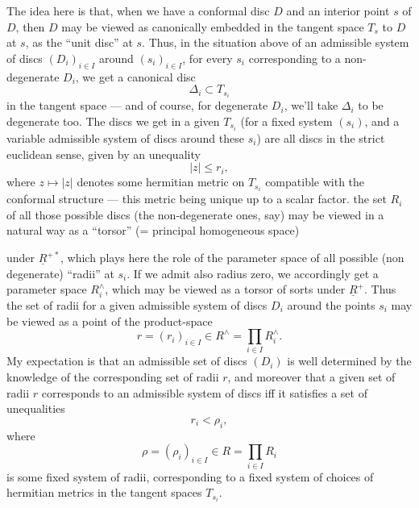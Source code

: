\documentclass[11pt,a4paper]{article}
\begin{document}
The idea here is that, when we have a conformal disc $D$ and an interior
point $s$ of $D$, then $D$ may be viewed as canonically embedded in the
tangent space $T_{s}$ to $D$ at $s$, as the “unit disc” at $s$. Thus, in the
situation above of an \struck{\ill{}} admissible system of discs
$(D_{i})_{i\in I}$ around $(s_{i})_{i\in I}$, for every $s_{i}$ corresponding
to a non-degenerate $D_{i}$, we get a canonical disc
\[
  \Delta_{i} \subset T_{s_{i}}
\]
in the tangent space — and of course, for degenerate $D_{i}$, we'll take
$\Delta_{i}$ to be degenerate too. The discs we get in a given $T_{s_{i}}$
(for a fixed system $(s_{i})$, and a variable admissible system of discs
around these $s_{i}$) are all discs in the strict euclidean sense, given by
an unequality
\[
  |z| \leqslant r_{i} ,
\]
where $z \mapsto |z|$ denotes some hermitian metric on $T_{s_{i}}$ compatible
with the conformal structure — this metric being  unique up to
a scalar factor. the set $R_{i}$ of all those possible discs (the
non-degenerate ones, say) may be viewed in a natural way as a “torsor”
(= principal homogeneous space)

under $\underline{R}^{+*}$, which plays here the role of the parameter space
of all possible (non degenerate) “radii” at $s_{i}$. If we admit also radius
zero, we accordingly get a parameter space $R_{i}^{\wedge}$, which may be
viewed as a torsor of sorts  under $\underline{R}^{+}$. Thus the
set of radii for a given admissible system of discs $D_{i}$ around the points
$s_{i}$ may be viewed as a point of the product-space
\[
  r = (r_{i})_{i\in I} \in R^{\wedge} = \prod_{i\in I} R_{i}^{\wedge} .
\]
My expectation is that an admissible set of discs $(D_{i})$ is well
determined by the knowledge of the corresponding set of radii $r$, and
moreover that a given set of radii $r$ corresponds to an admissible system of
 discs iff it satisfies a set of unequalities
\[
  r_{i} < \rho_{i} ,
\]
where
\[
  \rho = (\rho_{i})_{i\in I} \in R = \prod_{i\in I} R_{i}
\]
is  some fixed system of radii, corresponding to a fixed system of
choices of hermitian metrics in the tangent spaces $T_{s_{i}}$.
\end{document}
